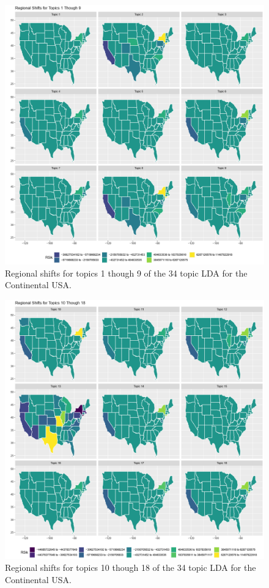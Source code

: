 \begin{figure}
	\centering
	\includegraphics[width=\linewidth]{Figures/ChapterV/States_01_09}
	\caption[Regional Shifts using 34 Topic LDA, Topics 1 thought 9]{Regional shifts for topics 1 though 9 of the 34 topic LDA for the Continental USA.}
	\label{fig:shift-share_lda34-1-9}
\end{figure}

\begin{figure}
	\centering
	\includegraphics[width=\linewidth]{Figures/ChapterV/States_10_18}
	\caption[Regional Shifts using 34 Topic LDA, Topics 10 thought 19]{Regional shifts for topics 10 though 18 of the 34 topic LDA for the Continental USA.}
	\label{fig:shift-share_lda34-10-18}
\end{figure}

